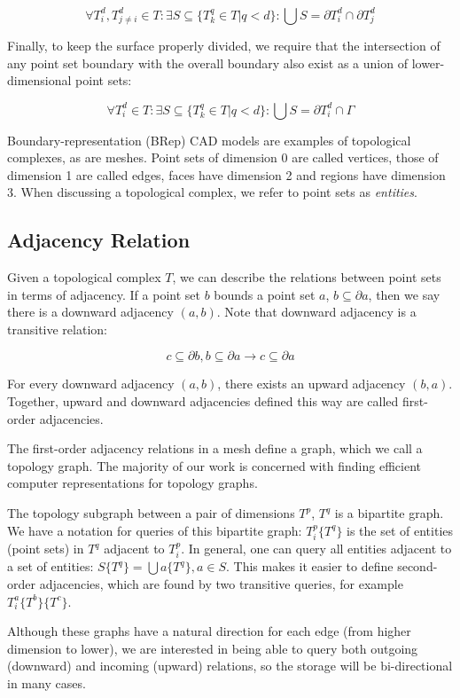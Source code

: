 \[\forall T^d_i,T^d_{j\neq i} \in T: \exists S \subseteq \{T^q_k \in T \big| q < d\}:
\bigcup S = \partial T^d_i \cap \partial T^d_j\]

Finally, to keep the surface properly divided, we require that
the intersection of any point set boundary with the overall
boundary also exist as a union of lower-dimensional point sets:

\[\forall T^d_i \in T: \exists S \subseteq \{T^q_k \in T \big| q < d\}:
\bigcup S = \partial T^d_i \cap \Gamma\]

Boundary-representation (BRep) CAD models are examples
of topological complexes, as are meshes.
Point sets of dimension 0 are called vertices, those
of dimension 1 are called edges, faces have dimension 2
and regions have dimension 3.
When discussing a topological complex, we
refer to point sets as \emph{entities}.

\subsection{Adjacency Relation}
\label{sec:def_adj}

Given a topological complex $T$, we can describe the relations between
point sets in terms of adjacency.
If a point set $b$ bounds a point set $a$,
$b \subseteq \partial a$, then we say there is a
downward adjacency $(a,b)$.
Note that downward adjacency is a transitive relation:

\[c \subseteq \partial b, b \subseteq \partial a \to c \subseteq \partial a\]

For every downward adjacency $(a,b)$, there exists an upward
adjacency $(b,a)$.
Together, upward and downward adjacencies defined this way
are called first-order adjacencies.

The first-order adjacency relations in a mesh define a graph,
which we call a topology graph.
The majority of our work is concerned with finding
efficient computer representations for topology graphs.

The topology subgraph between a pair of dimensions $T^p$, $T^q$
is a bipartite graph.
We have a notation for queries of this bipartite graph:
$T^p_i\{T^q\}$ is the set of entities (point sets) in $T^q$ adjacent to
$T^p_i$.
In general, one can query all entities adjacent
to a set of entities: $S\{T^q\} = \bigcup a \{T^q\}, a \in S$.
This makes it easier to define second-order adjacencies,
which are found by two transitive queries,
for example $T^a_i\{T^b\}\{T^c\}$.

Although these graphs have a natural direction for each
edge (from higher dimension to lower), we are interested
in being able to query both outgoing (downward) and
incoming (upward) relations, so the storage will be
bi-directional in many cases.


